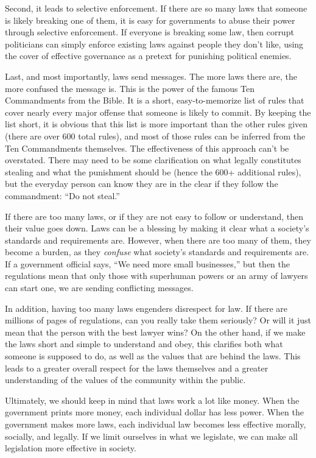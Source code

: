Second, it leads to selective enforcement. If there are so many laws
that someone is likely breaking one of them, it is easy for governments
to abuse their power through selective enforcement. If everyone is
breaking some law, then corrupt politicians can simply enforce existing
laws against people they don't like,
using the cover of
effective governance as a pretext for punishing political enemies.

Last, and most importantly, laws send messages. The more laws there are,
the more confused the message is. This is the power of the famous Ten
Commandments from the Bible. It is a short, easy-to-memorize list of
rules that cover nearly every major offense that someone is likely to
commit. By keeping the list short, it is obvious that this list is more
important than the other rules given (there are over 600 total rules),
and most of those rules can be inferred from the Ten Commandments
themselves. The effectiveness of this approach can't
be overstated. There may need to be some clarification on what legally
constitutes stealing and what the punishment should be (hence the 600+
additional rules), but the everyday person can know they are in the
clear if they follow the commandment: “Do not steal.”  

If there are too many laws, or if they are not easy to follow or
understand, then their value goes down. Laws can be a blessing by
making it clear what a society's standards and
requirements are. However, when there are too many of them, they become
a burden, as they \textit{confuse} what society's
standards and requirements are. If a government official says, “We need
more small businesses,” but then the regulations mean that only those
with superhuman powers or an army of lawyers can start one, we are
sending conflicting messages.

In addition, having too many laws engenders disrespect for law. If there
are millions of pages of regulations, can you really take them
seriously?  Or will it just mean that the person with the best lawyer wins? On the
other hand, if we make the laws short and simple to understand and
obey, this clarifies both what someone is supposed to do, as well as
the values that are behind the laws. This leads
to a greater overall respect for the laws themselves and a greater
understanding of the values of the community within the public.

Ultimately, we should
keep in mind that laws work a lot like money.  When the government
prints more money, each individual dollar has less power.  When
the government makes more laws, each individual law becomes less effective
morally, socially, and legally.  If we limit ourselves in what we legislate, we can make all legislation more
effective in society. 


